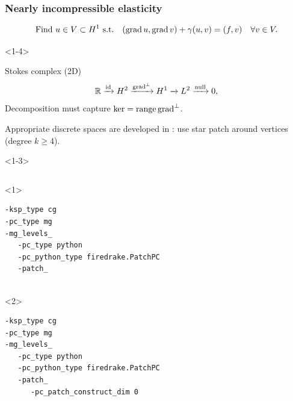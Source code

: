 \documentclass[presentation,aspectratio=43, 10pt]{beamer}
\DeclareMathOperator{\grad}{grad}
\let\div\relax
\DeclareMathOperator{\div}{div}
\DeclareMathOperator{\range}{range}
\begin{document}
\begin{frame}[fragile,t]
  \frametitle{Nearly incompressible elasticity}
  \vspace*{-1.5\baselineskip}
  \begin{equation*}
    \text{Find $u \in V \subset H^1$ s.t.} \quad (\grad u, \grad v) + \gamma (\div u, \div v) = (f, v) \quad \forall v \in V.
  \end{equation*}
  \vspace*{-\baselineskip}

  \begin{onlyenv}<1-4>
    \begin{block}{Stokes complex (2D)}
      \begin{equation*}
        \mathbb{R} \xrightarrow{\operatorname{id}} H^2
        \xrightarrow{\grad^\perp} H^1 \xrightarrow{\div} L^2 \xrightarrow{\operatorname{null}} 0,
      \end{equation*}
      Decomposition must capture $\ker \div = \range \grad^\perp$.

      Appropriate discrete spaces are developed in \textcite{Morgan:1975}: use
      star patch around vertices (degree $k \ge  4$).
    \end{block}
    \begin{onlyenv}<1-3>
      \begin{columns}[T]
        \begin{column}{0.6\textwidth}
          \begin{onlyenv}<1>
\begin{verbatim}
-ksp_type cg
-pc_type mg
-mg_levels_
   -pc_type python
   -pc_python_type firedrake.PatchPC
   -patch_


\end{verbatim}
          \end{onlyenv}
          \begin{onlyenv}<2>
\begin{verbatim}
-ksp_type cg
-pc_type mg
-mg_levels_
   -pc_type python
   -pc_python_type firedrake.PatchPC
   -patch_
      -pc_patch_construct_dim 0


\end{verbatim}
\end{onlyenv}
\end{column}
\end{columns}
\end{onlyenv}
\end{onlyenv}
\end{frame}
\end{document}
